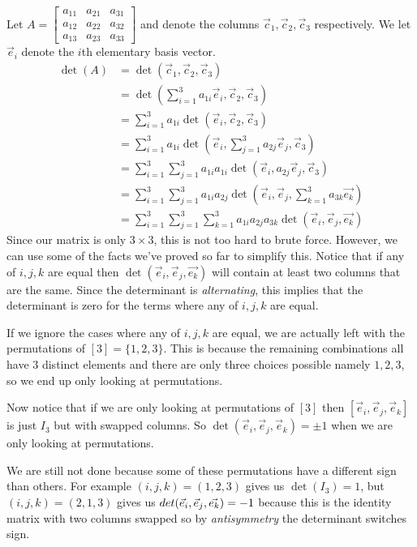 \begin{example}
    Let $A=\begin{bmatrix}
        a_{11} & a_{21} & a_{31}\\
        a_{12} & a_{22} & a_{32}\\
        a_{13} & a_{23} & a_{33}
    \end{bmatrix}$ and denote the columns $\vec{c}_1,\vec{c}_2,\vec{c}_3$ respectively. We let $\vec{e}_i$ denote the $i$th elementary basis vector.
    \begin{align*}
        \det(A)&=\det(\vec{c}_1,\vec{c}_2,\vec{c}_3)\\
        &=\det(\sum_{i=1}^3a_{1i}\vec{e}_i,\vec{c}_2,\vec{c}_3)\\
        &=\sum_{i=1}^3a_{1i}\det(\vec{e}_i,\vec{c}_2,\vec{c}_3)\tag{by Multilinearity}\\
        &=\sum_{i=1}^3a_{1i}\det(\vec{e}_i,\sum_{j=1}^3a_{2j}\vec{e}_j,\vec{c}_3)\\
        &=\sum_{i=1}^3\sum_{j=1}^3a_{1i}a_{1i}\det(\vec{e}_i,a_{2j}\vec{e}_j,\vec{c}_3)\tag{by Multilinearity}\\
        &=\sum_{i=1}^3\sum_{j=1}^3a_{1i}a_{2j}\det(\vec{e}_i,\vec{e}_j,\sum_{k=1}^3a_{3k}\vec{e_k})\\
        &=\sum_{i=1}^3\sum_{j=1}^3\sum_{k=1}^3a_{1i}a_{2j}a_{3k}\det(\vec{e}_i,\vec{e}_j,\vec{e_k})\tag{by Multilinearity}
    \end{align*}
    Since our matrix is only $3\times 3$, this is not too hard to brute force. However, we can use some of the facts we've proved so far to simplify this. Notice that if any of $i,j,k$ are equal then $\det(\vec{e}_i,\vec{e}_j,\vec{e_k})$ will contain at least two columns that are the same. Since the determinant is \textit{alternating}, this implies that the determinant is zero for the terms where any of $i,j,k$ are equal.

    If we ignore the cases where any of $i,j,k$ are equal, we are actually left with the permutations of $[3]=\{1,2,3\}$. This is because the remaining combinations all have $3$ distinct elements and there are only three choices possible namely $1,2,3$, so we end up only looking at permutations.

    Now notice that if we are only looking at permutations of $[3]$ then $[\vec{e}_i,\vec{e}_j,\vec{e}_k]$ is just $I_3$ but with swapped columns. So $\det(\vec{e}_i,\vec{e}_j,\vec{e}_k)=\pm 1$ when we are only looking at permutations.
    
    We are still not done because some of these permutations have a different sign than others. For example $(i,j,k)=(1,2,3)$ gives us $\det(I_3)=1$, but $(i,j,k)=(2,1,3)$ gives us $\\det(\vec{e}_i,\vec{e}_j,\vec{e_k})=-1$ because this is the identity matrix with two columns swapped so by \textit{antisymmetry} the determinant switches sign.
\end{example}

